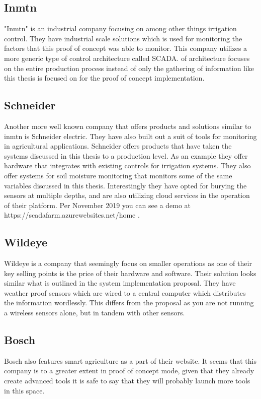 \documentclass[]{uiophd}
\begin{document}
\subsection{Inmtn}
"Inmtn" is an industrial company focusing on among other things irrigation control. They have industrial scale solutions which is used for monitoring the factors that this proof of concept was able to monitor. This company utilizes a more generic type of control architecture called SCADA.  of architecture focuses on the entire production process instead of only the gathering of information like this thesis is focused on for the proof of concept implementation. \cite{Inmntn}

\subsection{Schneider}
Another more well known company that offers products and solutions similar to inmtn is Schneider electric. They have also built out a suit of tools for monitoring in agricultural applications. Schneider offers products that have taken the systems discussed in this thesis to a production level. As an example they offer hardware that integrates with existing controls for irrigation systems. They also offer systems for soil moisture monitoring that monitors some of the same variables discussed in this thesis. Interestingly they have opted for burying the sensors at multiple depths, and are also utilizing cloud services in the operation of their platform. Per November 2019 you can see a demo at https://scadafarm.azurewebsites.net/home . 

\subsection{Wildeye}
Wildeye is a company that seemingly focus on smaller operations as one of their key selling points is the price of their hardware and software. Their solution looks similar what is outlined in the system implementation proposal. They have weather proof sensors which are wired to a central computer which distributes the information wordlessly. This differs from the proposal as you are not running a wireless sensors alone, but in tandem with other sensors. \cite{wildeye}

\subsection{Bosch}
Bosch also features smart agriculture as a part of their website. It seems that this company is to a greater extent in proof of concept mode, given that they already create advanced tools it is safe to say that they will probably launch more tools in this space.\cite{Bosch}
\end{document}
